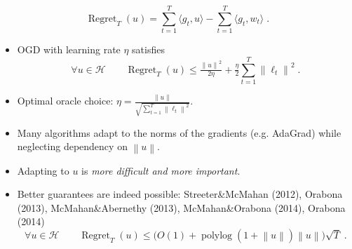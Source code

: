 \documentclass[largefonts,landscape]{sciposter}
\DeclareMathOperator{\Regret}{Regret}
\DeclareMathOperator{\polylog}{polylog}
\renewcommand{\H}{\mathcal{H}}
\newcommand{\norm}[1]{\left\|#1\right\|}
\begin{document}
\begin{multicols}{3}
\vspace{1cm}

$$
\Regret_T(u) = \sum_{t=1}^T \langle g_t, u \rangle - \sum_{t=1}^T \langle g_t, w_t \rangle\; .
$$

\begin{itemize}
\item OGD with learning rate $\eta$ satisfies
\[
\forall u \in \H \qquad \Regret_T(u) \le \tfrac{\norm{u}^2}{2\eta} + \tfrac{\eta}{2} \sum_{t=1}^T \norm{\ell_t}^2 \; .
\]
\item Optimal oracle choice: $\eta = \frac{\norm{u}}{\sqrt{\sum_{t=1}^T \norm{\ell_t}^2}}$.
\item Many algorithms adapt to the norms of the gradients (e.g. AdaGrad) while neglecting dependency on $\norm{u}$.
\item Adapting to $u$ is \emph{more difficult and more important}.
\item Better guarantees are indeed possible: Streeter\&McMahan (2012), Orabona (2013), McMahan\&Abernethy (2013), McMahan\&Orabona (2014), Orabona (2014)
\[
\forall u \in \H \qquad \Regret_T(u) \le \big(O(1)+\polylog(1 + \norm{u})\norm{u} \big) \sqrt{T} \; .
\]
\end{itemize}

\columnbreak


\end{multicols}
\end{document}
